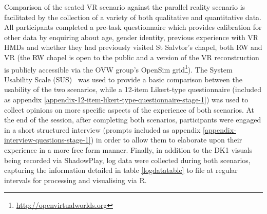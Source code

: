 Comparison of the seated VR scenario against the parallel reality scenario is facilitated by the collection of a variety of both qualitative and quantitative data. All participants completed a pre-task questionnaire which provides calibration for other data by enquiring about age, gender identity, previous experience with VR HMDs and whether they had previously visited St Salvtor's chapel, both RW and VR (the RW chapel is open to the public and a version of the VR reconstruction is publicly accessible via the OVW group's OpenSim grid\footnote{\url{http://openvirtualworlds.org}}). The System Usability Scale (SUS)~\cite{Brooke1996} was used to provide a basic comparison between the usability of the two scenarios, while a 12-item Likert-type questionnaire (included as appendix \ref{appendix-12-item-likert-type-questionnaire-stage-1}) was used to collect opinions on more specific aspects of the experience of both scenarios. At the end of the session, after completing both scenarios, participants were engaged in a short structured interview (prompts included as appendix \ref{appendix-interview-questions-stage-1}) in order to allow them to elaborate upon their experience in a more free form manner. Finally, in addition to the DK1 visuals being recorded via ShadowPlay, log data were collected during both scenarios, capturing the information detailed in table \ref{logdatatable} to file at regular intervals for processing and visualising via R.

